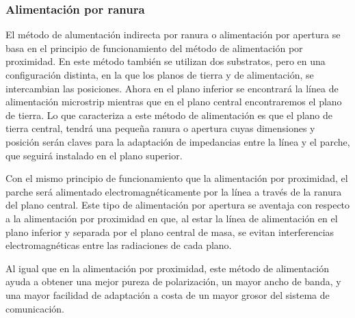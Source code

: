 \subsubsection{Alimentación por ranura}
\par El método de alumentación indirecta por ranura o alimentación por apertura se basa en el principio de funcionamiento del método de alimentación por proximidad. En este método también se utilizan dos substratos, pero en una configuración distinta, en la que los planos de tierra y de alimentación, se intercambian las posiciones. Ahora en el plano inferior se encontrará la línea de alimentación microstrip mientras que en el plano central encontraremos el plano de tierra. Lo que caracteriza a este método de alimentación es que el plano de tierra central, tendrá una pequeña ranura o apertura cuyas dimensiones y posición serán claves para la adaptación de impedancias entre la línea y el parche, que seguirá instalado en el plano superior.
\\
\par Con el mismo principio de funcionamiento que la alimentación por proximidad, el parche será alimentado electromagnéticamente por la línea a través de la ranura del plano central. Este tipo de alimentación por apertura se aventaja con respecto a la alimentación por proximidad en que, al estar la línea de alimentación en el plano inferior y separada por el plano central de masa, se evitan interferencias electromagnéticas entre las radiaciones de cada plano.
\\
\par Al igual que en la alimentación por proximidad, este método de alimentación ayuda a obtener una mejor pureza de polarización, un mayor ancho de banda, y una mayor facilidad de adaptación a costa de un mayor grosor del sistema de comunicación.
\\


